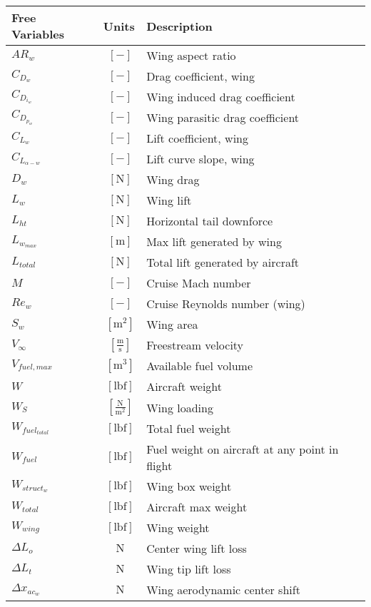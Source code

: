 \documentclass[12pt]{article}
\begin{document}
{\footnotesize
\begin{supertabular}{lcl}
\toprule
Free Variables & Units & Description \\ \midrule
$AR_w$ & $~[-]$ & Wing aspect ratio \\
$C_{D_w}$ & $~[-]$ & Drag coefficient, wing \\
$C_{D_{i_w}}$ & $~[-]$ & Wing induced drag coefficient \\
$C_{D_{p_w}}$ & $~[-]$ & Wing parasitic drag coefficient \\
$C_{L_w}$ & $~[-]$ & Lift coefficient, wing \\
$C_{L_{\alpha-w}}$ & $~[-]$ & Lift curve slope, wing \\
$D_{w}$ & $~\mathrm{[N]}$ & Wing drag \\
$L_w$ & $~\mathrm{[N]}$ & Wing lift \\
$L_{ht}$ & $~\mathrm{[N]}$ & Horizontal tail downforce \\
$L_{w_{max}}$ & $~\mathrm{[m]}$ & Max lift generated by wing\\
$L_{total}$ & $~\mathrm{[N]}$ & Total lift generated by aircraft\\ 
$M$ & $~[-]$ & Cruise Mach number \\
$Re_w$ & $~[-]$ & Cruise Reynolds number (wing) \\
$S_w$ & $~\mathrm{[m^{2}]}$ & Wing area \\
$V_{\infty}$ & $~\mathrm{[\tfrac{m}{s}]}$ & Freestream velocity \\
$V_{fuel, max}$ & $~\mathrm{[m^{3}]}$ & Available fuel volume \\
$W$ & $~\mathrm{[lbf]}$ & Aircraft weight \\
$W_{S}$ & $~\mathrm{[\frac{N}{m^2}]}$ & Wing loading \\
$W_{fuel_{total}}$ & $~\mathrm{[lbf]}$ & Total fuel weight \\
$W_{fuel}$ & $~\mathrm{[lbf]}$ & Fuel weight on aircraft at any point in flight\\
$W_{struct_{w}}$ & $~\mathrm{[lbf]}$ & Wing box weight \\
$W_{total}$ & $~\mathrm{[lbf]}$ & Aircraft max weight \\
$W_{wing}$ & $~\mathrm{[lbf]}$ & Wing weight \\
$\Delta L_{o}$ & $~\mathrm{N}$ & Center wing lift loss \\
$\Delta L_{t}$ & $~\mathrm{N}$ & Wing tip lift loss \\
$\Delta x_{ac_w}$ & $~\mathrm{N}$ & Wing aerodynamic center shift \\

\end{supertabular}}
\end{document}
